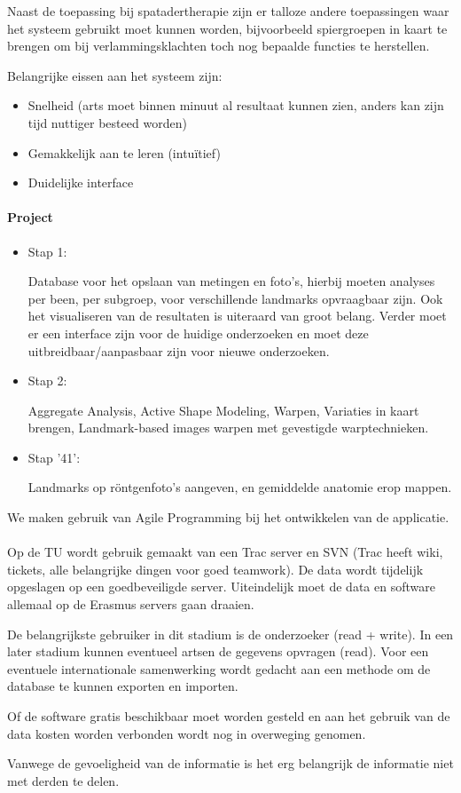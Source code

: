Naast de toepassing bij spatadertherapie zijn er talloze andere toepassingen waar het systeem gebruikt moet kunnen worden, bijvoorbeeld spiergroepen in kaart te brengen om bij verlammingsklachten toch nog bepaalde functies te herstellen. 

Belangrijke eissen aan het systeem zijn: 

\begin{itemize}
	\item Snelheid (arts moet binnen minuut al resultaat kunnen zien, anders kan zijn tijd nuttiger besteed worden) 
	\item Gemakkelijk aan te leren (intu\"itief) 
	\item Duidelijke interface 
\end{itemize}

\paragraph{Project}
\begin{itemize}
\item Stap 1: 

Database voor het opslaan van metingen en foto's, hierbij moeten analyses per been, per subgroep, voor verschillende landmarks opvraagbaar zijn. Ook het visualiseren van de resultaten is uiteraard van groot belang. Verder moet er een interface zijn voor de huidige onderzoeken en moet deze uitbreidbaar/aanpasbaar zijn voor nieuwe onderzoeken. 

\item Stap 2: 

Aggregate Analysis, Active Shape Modeling, Warpen, Variaties in kaart brengen, Landmark-based images warpen met gevestigde warptechnieken. 

\item Stap '41': 

Landmarks op r\"ontgenfoto's aangeven, en gemiddelde anatomie erop mappen. 
\end{itemize}

We maken gebruik van Agile Programming bij het ontwikkelen van de applicatie.

\paragraph{}
Op de TU wordt gebruik gemaakt van een Trac server en SVN (Trac heeft wiki, tickets, alle belangrijke dingen voor goed teamwork). De data wordt tijdelijk opgeslagen op een goedbeveiligde server. Uiteindelijk moet de data en software allemaal op de Erasmus servers gaan draaien. 

De belangrijkste gebruiker in dit stadium is de onderzoeker (read + write). In een later stadium kunnen eventueel artsen de gegevens opvragen (read). Voor een eventuele internationale samenwerking wordt gedacht aan een methode om de database te kunnen exporten en importen. 

Of de software gratis beschikbaar moet worden gesteld en aan het gebruik van de data kosten worden verbonden wordt nog in overweging genomen. 

Vanwege de gevoeligheid van de informatie is het erg belangrijk de informatie niet met derden te delen. 
